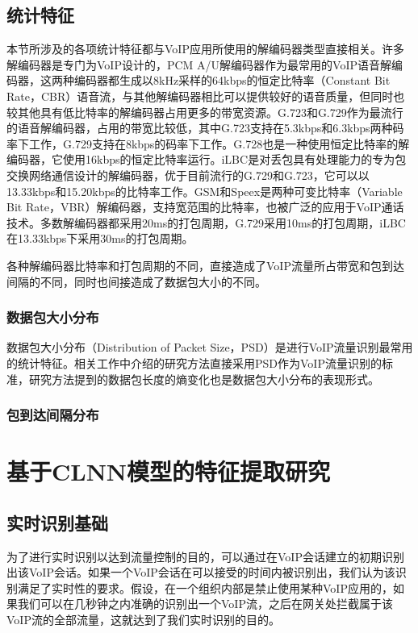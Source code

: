 \subsection{统计特征}
\label{sec:statisticalfeatures}
本节所涉及的各项统计特征都与VoIP应用所使用的解编码器类型直接相关。许多解编码器是专门为VoIP设计的，PCM A/U解编码器作为最常用的VoIP语音解编码器，这两种编码器都生成以8kHz采样的64kbps的恒定比特率（Constant Bit Rate，CBR）语音流，与其他解编码器相比可以提供较好的语音质量，但同时也较其他具有低比特率的解编码器占用更多的带宽资源。G.723和G.729作为最流行的语音解编码器，占用的带宽比较低，其中G.723支持在5.3kbps和6.3kbps两种码率下工作，G.729支持在8kbps的码率下工作。G.728也是一种使用恒定比特率的解编码器，它使用16kbps的恒定比特率运行。iLBC是对丢包具有处理能力的专为包交换网络通信设计的解编码器，优于目前流行的G.729和G.723，它可以以13.33kbps和15.20kbps的比特率工作。GSM和Speex是两种可变比特率（Variable Bit Rate，VBR）解编码器，支持宽范围的比特率，也被广泛的应用于VoIP通话技术。多数解编码器都采用20ms的打包周期，G.729采用10ms的打包周期，iLBC在13.33kbps下采用30ms的打包周期。

各种解编码器比特率和打包周期的不同，直接造成了VoIP流量所占带宽和包到达间隔的不同，同时也间接造成了数据包大小的不同。

\subsubsection{数据包大小分布}
数据包大小分布（Distribution of Packet Size，PSD）是进行VoIP流量识别最常用的统计特征。相关工作中介绍的研究方法\supercite{22}直接采用PSD作为VoIP流量识别的标准，研究方法\supercite{4}提到的数据包长度的熵变化也是数据包大小分布的表现形式。




\subsubsection{包到达间隔分布}




\section{基于CLNN模型的特征提取研究}
\subsection{实时识别基础}
为了进行实时识别以达到流量控制的目的，可以通过在VoIP会话建立的初期识别出该VoIP会话。如果一个VoIP会话在可以接受的时间内被识别出，我们认为该识别满足了实时性的要求。假设，在一个组织内部是禁止使用某种VoIP应用的，如果我们可以在几秒钟之内准确的识别出一个VoIP流，之后在网关处拦截属于该VoIP流的全部流量，这就达到了我们实时识别的目的。

